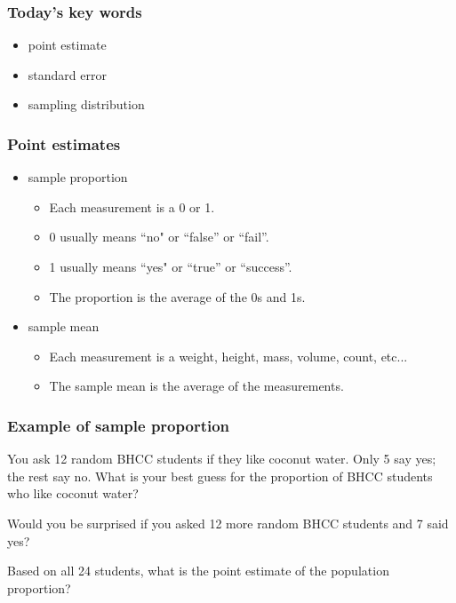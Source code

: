 
\begin{frame}
\frametitle{Today's key words}
\begin{itemize}
\item point estimate
\item standard error
\item sampling distribution
\end{itemize}
\end{frame}



\begin{frame}
\frametitle{Point estimates}
\begin{itemize}
\item sample proportion
\begin{itemize}
\item Each measurement is a 0 or 1.
\item 0 usually means ``no" or ``false'' or ``fail''.
\item 1 usually means ``yes" or ``true'' or ``success''.
\item The proportion is the average of the 0s and 1s.
\end{itemize}
\item sample mean
\begin{itemize}
\item Each measurement is a weight, height, mass, volume, count, etc...
\item The sample mean is the average of the measurements.
\end{itemize}
\end{itemize}
\end{frame}




\begin{frame}
\frametitle{Example of sample proportion}
You ask 12 random BHCC students if they like coconut water. Only 5 say yes; the rest say no. \pause
What is your best guess for the proportion of BHCC students who like coconut water?\pause
{}

\pause
\vfill
Would you be surprised if you asked 12 more random BHCC students and 7 said yes?

\pause
{}
\vfill

\pause
Based on all 24 students, what is the point estimate of the population proportion?
\pause
{}
\end{frame}


